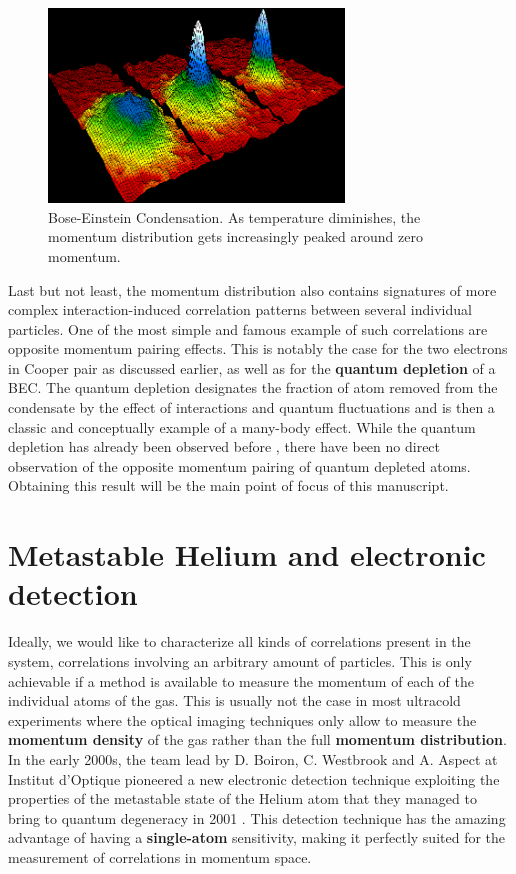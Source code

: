 \begin{figure}
    \centering
    \includegraphics[width=0.7\textwidth]{Fig/Intro/BEC.png}
    \caption[Momentum distribution across Bose-Einstein Condensation]{Bose-Einstein Condensation. As temperature diminishes, the momentum distribution gets increasingly peaked around zero momentum.}
    \label{fig:1st_BEC}
\end{figure}


Last but not least, the momentum distribution also contains signatures of more complex interaction-induced correlation patterns between several individual particles. One of the most simple and famous example of such correlations are opposite momentum pairing effects. This is notably the case for the two electrons in Cooper pair as discussed earlier, as well as for the \textbf{quantum depletion} of a BEC. The quantum depletion designates the fraction of atom removed from the condensate by the effect of interactions and quantum fluctuations and is then a classic and conceptually example of a many-body effect. While the quantum depletion has already been observed before \cite{chang2016,lopes2017,xu2006}, there have been no direct observation of the opposite momentum pairing of quantum depleted atoms. Obtaining this result will be the main point of focus of this manuscript.

\section*{Metastable Helium and electronic detection}

Ideally, we would like to characterize all kinds of correlations present in the system, \ie correlations involving an arbitrary amount of particles. This is only achievable if a method is available to measure the momentum of each of the individual atoms of the gas. This is usually not the case in most ultracold experiments where the optical imaging techniques only allow to measure the \textbf{momentum density} of the gas rather than the full \textbf{momentum distribution}. In the early 2000s, the team lead by D. Boiron, C. Westbrook and A. Aspect at Institut d'Optique pioneered a new electronic detection technique exploiting the properties of the metastable state of the Helium atom that they managed to bring to quantum degeneracy in 2001 \cite{robert2001bose}. This detection technique has the amazing advantage of having a \textbf{single-atom} sensitivity, making it perfectly suited for the measurement of correlations in momentum space.

